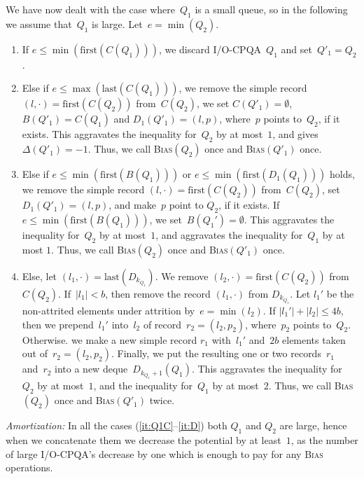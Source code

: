\documentclass[]{article}
\newcommand{\first}{\text{first}}
\newcommand{\last}{\text{last}}
\begin{document}
\noindent We have now dealt with the case where~$Q_1$ is a small queue, so in
the following we assume that~$Q_1$ is large. Let~$e = \min(Q_2)$.
\begin{enumerate}[1)]
  \item \label{it:Q1C} If $e \leq \min(\first(C(Q_1)))$, we discard
    I/O-CPQA~$Q_1$ and set~$Q'_1 = Q_2$.

  \item \label{it:Q1lastC} Else if $e \leq \max(\last(C(Q_1)))$, we remove the
    simple record $(l,\cdot) = \first(C(Q_2))$ from~$C(Q_2)$, we set $C(Q'_1) =
    \emptyset$, $B(Q'_1) = C(Q_1)$ and $D_1(Q'_1) = (l,p)$, where~$p$ points
    to~$Q_2$, if it exists. This aggravates the inequality for~$Q_2$ by at
    most~$1$, and gives~$\Delta (Q'_1) = - 1$. Thus, we call
    \textsc{Bias}$(Q_2)$ once and \textsc{Bias}$(Q'_1)$ once.

  \item \label{it:B} Else if $e \leq \min(\first(B(Q_1)))$ or $e \leq
    \min(\first(D_1(Q_1)))$ holds, we remove the simple record $(l,\cdot) =
    \first(C(Q_2))$ from~$C(Q_2)$, set $D_1(Q'_1) =(l,p)$, and make~$p$ point to
    $Q_2$, if it exists. If $e \leq \min(\first(B(Q_1)))$, we set~$B(Q_1') =
    \emptyset$. This aggravates the inequality for~$Q_2$ by at most~$1$, and
    aggravates the inequality for~$Q_1$ by at most $1$. Thus, we call
    \textsc{Bias}$(Q_2)$ once and \textsc{Bias}$(Q'_1)$ once.

  \item \label{it:D} Else, let $(l_1,\cdot) = \last(D_{k_{Q_1}})$. We remove
    $(l_2,\cdot) =\first(C(Q_2))$ from $C(Q_2)$. If~$|l_1| < b$, then remove the
    record $(l_1,\cdot)$ from $D_{k_{Q_1}}$. Let $l_1'$ be the non-attrited
    elements under attrition by~$e = \min(l_2)$. If $|l_1'| + |l_2| \leq 4b$,
    then we prepend~$l_1'$ into~$l_2$ of record~$r_2 =(l_2, p_2)$, where~$p_2$
    points to~$Q_2$. Otherwise. we make a new simple record $r_1$ with~$l_1'$
    and~$2b$ elements taken out of~$r_2=(l_2,p_2)$. Finally, we put the
    resulting one or two records~$r_1$ and~$r_2$ into a new
    deque~$D_{k_{Q_1}+1}(Q_1)$.  This aggravates the inequality for~$Q_2$ by at
    most~$1$, and the inequality for~$Q_1$ by at most~$2$. Thus, we call
    \textsc{Bias}$(Q_2)$ once and \textsc{Bias}$(Q'_1)$ twice.
\end{enumerate}
\noindent \textit{Amortization:} In all the cases (\ref{it:Q1C}--\ref{it:D})
both $Q_1$ and $Q_2$ are large, hence when we concatenate them we decrease the
potential by at least~$1$, as the number of large I/O-CPQA's decrease by one
which is enough to pay for any \textsc{Bias} operations.
\end{document}
